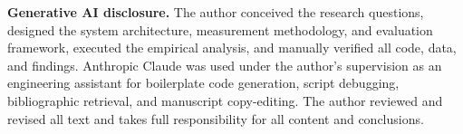 \textbf{Generative AI disclosure.} The author conceived the research questions, designed the system architecture, measurement methodology, and evaluation framework, executed the empirical analysis, and manually verified all code, data, and findings. Anthropic Claude was used under the author's supervision as an engineering assistant for boilerplate code generation, script debugging, bibliographic retrieval, and manuscript copy-editing. The author reviewed and revised all text and takes full responsibility for all content and conclusions.
